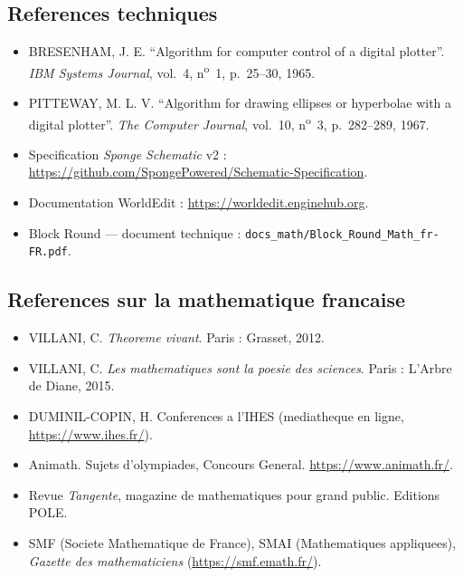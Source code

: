 \documentclass[12pt,a4paper]{scrartcl}
\begin{document}
\subsection{References techniques}
\begin{itemize}[leftmargin=1.3em,itemsep=0.15em,topsep=0.3em]
  \item BRESENHAM, J. E. \enquote{Algorithm for computer control of a digital plotter}. \emph{IBM Systems Journal}, vol.~4, n\textsuperscript{o}~1, p.~25--30, 1965.
  \item PITTEWAY, M. L. V. \enquote{Algorithm for drawing ellipses or hyperbolae with a digital plotter}. \emph{The Computer Journal}, vol.~10, n\textsuperscript{o}~3, p.~282--289, 1967.
  \item Specification \emph{Sponge Schematic} v2 : \url{https://github.com/SpongePowered/Schematic-Specification}.
  \item Documentation WorldEdit : \url{https://worldedit.enginehub.org}.
  \item Block Round --- document technique : \texttt{docs\_math/Block\_Round\_Math\_fr-FR.pdf}.
\end{itemize}

\subsection{References sur la mathematique francaise}
\begin{itemize}[leftmargin=1.3em,itemsep=0.15em,topsep=0.3em]
  \item VILLANI, C. \emph{Theoreme vivant}. Paris : Grasset, 2012.
  \item VILLANI, C. \emph{Les mathematiques sont la poesie des sciences}. Paris : L'Arbre de Diane, 2015.
  \item DUMINIL-COPIN, H. Conferences a l'IHES (mediatheque en ligne, \url{https://www.ihes.fr/}).
  \item Animath. Sujets d'olympiades, Concours General. \url{https://www.animath.fr/}.
  \item Revue \emph{Tangente}, magazine de mathematiques pour grand public. Editions POLE.
  \item SMF (Societe Mathematique de France), SMAI (Mathematiques appliquees), \emph{Gazette des mathematiciens} (\url{https://smf.emath.fr/}).
\end{itemize}


\newpage
\appendix
\renewcommand{\thesection}{\Alph{section}}
\setcounter{section}{0}
\end{document}
